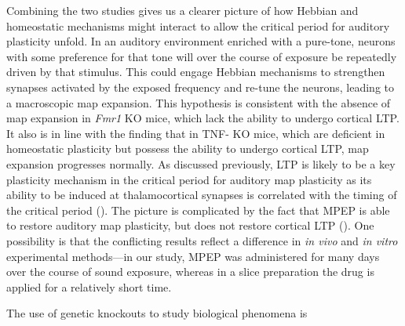 Combining the two studies gives us a clearer picture of how Hebbian and homeostatic mechanisms might interact to allow the critical period for auditory plasticity unfold. In an auditory environment enriched with a pure-tone, neurons with some preference for that tone will over the course of exposure be repeatedly driven by that stimulus. This could engage Hebbian mechanisms to strengthen synapses activated by the exposed frequency and re-tune the neurons, leading to a macroscopic map expansion. This hypothesis is consistent with the absence of map expansion in \textit{Fmr1} KO mice, which lack the ability to undergo cortical LTP. It also is in line with the finding that in TNF-\textalpha{} KO mice, which are deficient in homeostatic plasticity but possess the ability to undergo cortical LTP, map expansion progresses normally. As discussed previously, LTP is likely to be a key plasticity mechanism in the critical period for auditory map plasticity as its ability to be induced at thalamocortical synapses is correlated with the timing of the critical period (\cite{Chun2013}). The picture is complicated by the fact that MPEP is able to restore auditory map plasticity, but does not restore cortical LTP (\cite{Wilson2007}). One possibility is that the conflicting results reflect a difference in \textit{in vivo} and \textit{in vitro} experimental methods---in our study, MPEP was administered for many days over the course of sound exposure, whereas in a slice preparation the drug is applied for a relatively short time.

The use of genetic knockouts to study biological phenomena is 
